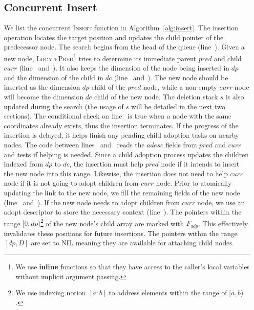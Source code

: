 \documentclass[10pt,journal,letterpaper,compsoc]{IEEEtran}
\begin{document}
\subsection{Concurrent Insert}
\label{sec:cpqueueins}
We list the concurrent \textsc{Insert} function in Algorithm~\ref{alg:insert}.
The insertion operation locates the target position and updates the child pointer of the predecessor node.
The search begins from the head of the queue (line~).
Given a new node, \textsc{LocatePred}\footnote{We use \textbf{inline} functions so that they have access to the caller's local variables without implicit argument passing.} tries to determine its immediate parent $pred$ and child $curr$ (line~ and~).
It also keeps the dimension of the node being inserted in $dp$ and the dimension of the child in $dc$ (line~ and~).
The new node should be inserted as the dimension $dp$ child of the $pred$ node, while a non-empty $curr$ node will become the dimension $dc$ child of the new node.
The deletion stack $s$ is also updated during the search (the usage of $s$ will be detailed in the next two sections).
The conditional check on line~ is true when a node with the same coordinates already exists, thus the insertion terminates.
If the progress of the insertion is delayed, it helps finish any pending child adoption tasks on nearby nodes.
The code between lines~ and~ reads the $adesc$ fields from $pred$ and $curr$ and tests if helping is needed.
Since a child adoption process updates the children indexed from $dp$ to $dc$, the insertion must help $pred$ node if it intends to insert the new node into this range.
Likewise, the insertion does not need to help $curr$ node if it is not going to adopt children from $curr$ node.
Prior to atomically updating the link to the new node, we fill the remaining fields of the new node (line~ and~).
If the new node needs to adopt children from $curr$ node, we use an adopt descriptor to store the necessary context (line~).
The pointers within the range $[0, dp)$\footnote{We use indexing notion $[a:b]$ to address elements within the range of $[a, b)$.} of the new node's child array are marked with $F_{adp}$.
This effectively invalidates these positions for future insertions.
The pointers within the range $[dp, D]$ are set to \textsc{NIL} meaning they are available for attaching child nodes.
\end{document}
